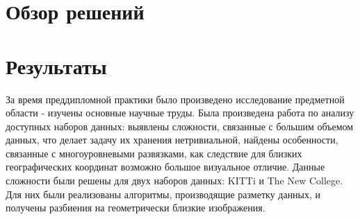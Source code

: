 \documentclass[12pt, specialist, subf, substylefile = spbu.rtx]{disser}
\begin{document}
\newpage
\section{Обзор решений}

\newpage
\section{Результаты}
За время преддипломной практики было произведено исследование предметной области - изучены основные научные труды. Была произведена работа по анализу доступных наборов данных: выявлены сложности, связанные с большим объемом данных, что делает задачу их хранения нетривиальной, найдены особенности, связанные с многоуровневыми развязками, как следствие для близких географических координат возможно большое визуальное отличие. Данные сложности были решены для двух наборов данных: KITTi и The New College. Для них были реализованы алгоритмы, производящие разметку данных, и получены разбиения на геометрически близкие изображения.
\end{document}
